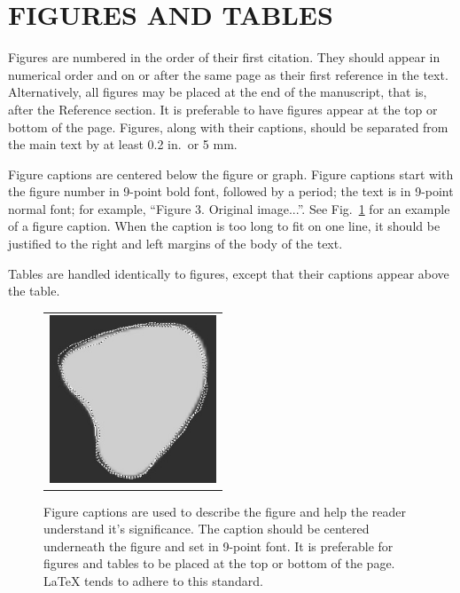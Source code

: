 \documentclass[]{spie}  %
\begin{document}
\section{FIGURES AND TABLES}

Figures are numbered in the order of their first citation.  They should appear in numerical order and on or after the same page as their first reference in the text.  Alternatively, all figures may be placed at the end of the manuscript, that is, after the Reference section.  It is preferable to have figures appear at the top or bottom of the page.  Figures, along with their captions, should be separated from the main text by at least 0.2 in.\ or 5 mm.  

Figure captions are centered below the figure or graph.  Figure captions start with the figure number in 9-point bold font, followed by a period; the text is in 9-point normal font; for example, ``{\footnotesize{Figure 3.}  Original image...}''.  See Fig.~\ref{fig:example} for an example of a figure caption.  When the caption is too long to fit on one line, it should be justified to the right and left margins of the body of the text.  

Tables are handled identically to figures, except that their captions appear above the table. 

   \begin{figure} [ht]
   \begin{center}
   \begin{tabular}{c} %
   \includegraphics[height=5cm]{mcr3b.eps}
   \end{tabular}
   \end{center}
   \caption[example] 
   { \label{fig:example} 
Figure captions are used to describe the figure and help the reader understand it's significance.  The caption should be centered underneath the figure and set in 9-point font.  It is preferable for figures and tables to be placed at the top or bottom of the page. LaTeX tends to adhere to this standard.}
   \end{figure} 
\end{document}
